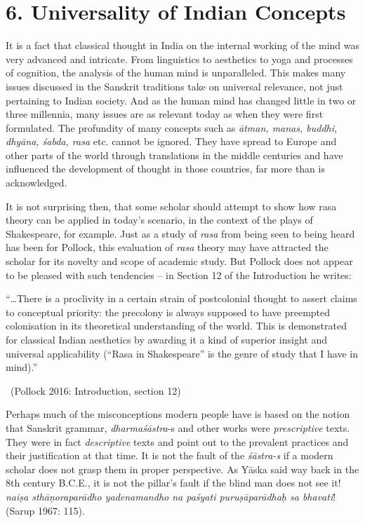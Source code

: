 \section*{6. Universality of Indian Concepts}

It is a fact that classical thought in India on the internal working of the mind was very advanced and intricate. From linguistics to aesthetics to yoga and processes of cognition, the analysis of the human mind is unparalleled. This makes many issues discussed in the Sanskrit traditions take on universal relevance, not just pertaining to Indian society. And as the human mind has changed little in two or three millennia, many issues are as relevant today as when they were first formulated. The profundity of many concepts such as \textit{ātman, manas, buddhi, dhyāna, śabda, rasa} etc. cannot be ignored. They have spread to Europe and other parts of the world through translations in the middle centuries and have influenced the development of thought in those countries, far more than is acknowledged.

It is not surprising then, that some scholar should attempt to show how rasa theory can be applied in today’s scenario, in the context of the plays of Shakespeare, for example. Just as a study of \textit{rasa} from being seen to being heard has been for Pollock, this evaluation of \textit{rasa} theory may have attracted the scholar for its novelty and scope of academic study. But Pollock does not appear to be pleased with such tendencies – in Section 12 of the Introduction he writes:

\begin{myquote}
“…There is a proclivity in a certain strain of postcolonial thought to assert claims to conceptual priority: the precolony is always supposed to have preempted colonisation in its theoretical understanding of the world. This is demonstrated for classical Indian aesthetics by awarding it a kind of superior insight and universal applicability (“Rasa in Shakespeare” is the genre of study that I have in mind).” 

~\hfill (Pollock 2016: Introduction, section 12)
\end{myquote}

Perhaps much of the misconceptions modern people have is based on the notion that Sanskrit grammar, \textit{dharmaśāstra}-s and other works were \textit{prescriptive} texts. They were in fact \textit{descriptive} texts and point out to the prevalent practices and their justification at that time. It is not the fault of the \textit{śāstra-s} if a modern scholar does not grasp them in proper perspective. As Yāska said way back in the 8th century B.C.E., it is not the pillar’s fault if the blind man does not see it! \textit{naiṣa sthāṇoraparādho yadenamandho na paśyati  puruṣāparādhaḥ sa bhavati}! (Sarup 1967: 115).


